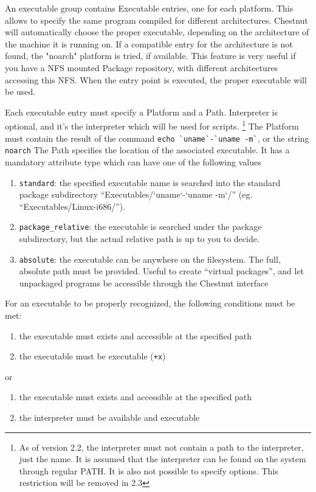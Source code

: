 An executable group contains Executable entries, one for each platform. This
allows to specify the same program compiled for different architectures.
Chestnut will automatically choose the proper executable, depending on the
architecture of the machine it is running on. If a compatible entry for the
architecture is not found, the "noarch" platform is tried, if available.  This
feature is very useful if you have a NFS mounted Package repository, with
different architectures accessing this NFS. When the entry point is executed,
the proper executable will be used.

Each executable entry must specify a Platform and a Path. Interpreter is
optional, and it's the interpreter which will be used for scripts. 
\footnote{As of version 2.2, the interpreter must not contain a path to the interpreter,
just the name. It is assumed that the interpreter can be found on the system
through regular PATH. It is also not possible to specify options. This
restriction will be removed in 2.3}
The Platform must contain the result of the command \verb+echo `uname`-`uname -m`+, or the string \verb+noarch+
The Path specifies the location of the associated executable. It has a mandatory attribute type which can have one
of the following values

\begin{enumerate}
\item \verb+standard+: the specified executable name is searched into the standard package
subdirectory “Executables/`uname`-`uname -m`/” (eg. “Executables/Linux-i686/”).
\item \verb+package_relative+: the executable is searched under the package
subdirectory, but the actual relative path is up to you to decide.
\item \verb+absolute+: the executable can be anywhere on the filesystem.  The full,
absolute path must be provided. Useful to create “virtual packages”, and let
unpackaged programs be accessible through the Chestnut interface 
\end{enumerate}

For an executable to be properly recognized, the following conditions must be met:
\begin{enumerate}
\item the executable must exists and accessible at the specified path
\item the executable must be executable (\verb=+x=)
\end{enumerate}
or
\begin{enumerate}
\item the executable must exists and accessible at the specified path
\item the interpreter must be available and executable
\end{enumerate}

